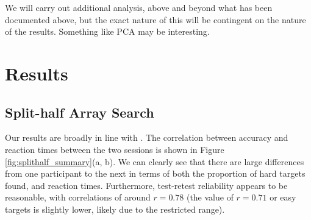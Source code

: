 \documentclass[]{rsos}%
\begin{document}
We will carry out additional analysis, above and beyond what has been documented above, but the exact nature of this will be contingent on the nature of the results. Something like PCA may be interesting. 

\section{Results}

\subsection{Split-half Array Search}
Our results are broadly in line with \cite{nowakowsak2017}. The correlation between accuracy and reaction times between the two sessions is shown in Figure \ref{fig:splithalf_summary}(a, b). We can clearly see that there are large differences from one participant to the next in terms of both the proportion of hard targets found, and reaction times. Furthermore, test-retest reliability appears to be reasonable, with correlations of around $r = 0.78$ (the value of $r = 0.71$ or easy targets is slightly lower, likely due to the restricted range).
\end{document}
